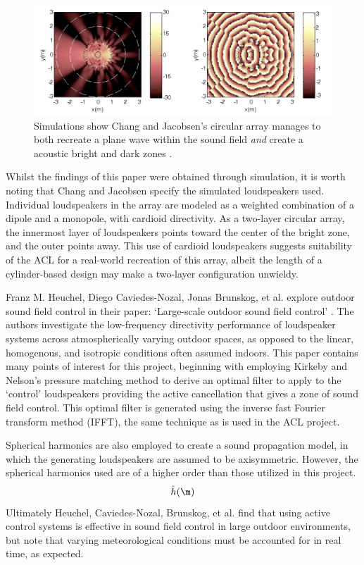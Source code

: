 \documentclass{report}
\begin{document}
        \begin{figure}[H]
            \centering
            \includegraphics[width = 0.6\linewidth]{figs/changField.png}
            \caption{Simulations show Chang and Jacobsen's circular array manages to both recreate a plane wave within the sound field \textit{and} create a acoustic bright and dark zones \cite{chang2012sound}.}
            \label{changField}
        \end{figure}

        Whilst the findings of this paper were obtained through simulation, it is worth noting that Chang and Jacobsen specify the simulated loudspeakers used.
        Individual loudspeakers in the array are modeled as a weighted combination of a dipole and a monopole, with cardioid directivity.
        As a two-layer circular array, the innermost layer of loudspeakers points toward the center of the bright zone, and the outer points away.
        This use of cardioid loudspeakers suggests suitability of the ACL for a real-world recreation of this array, albeit the length of a cylinder-based design may make a two-layer configuration unwieldy.

        Franz M. Heuchel, Diego Caviedes-Nozal, Jonas Brunskog, et al. explore outdoor sound field control in their paper: `Large-scale outdoor sound field control' \cite{heuchel2020large}.
        The authors investigate the low-frequency directivity performance of loudspeaker systems across atmospherically varying outdoor spaces, as opposed to the linear, homogenous, and isotropic conditions often assumed indoors.
        This paper contains many points of interest for this project, beginning with employing Kirkeby and Nelson's pressure matching method \cite{kirkeby1993reproduction} to derive an optimal filter to apply to the `control' loudspeakers providing the active cancellation that gives a zone of sound field control.
        This optimal filter is generated using the inverse fast Fourier transform method (IFFT), the same technique as is used in the ACL project.
        
        Spherical harmonics are also employed to create a sound propagation model, in which the generating loudspeakers are assumed to be axisymmetric.
        However, the spherical harmonics used are of a higher order than those utilized in this project.
        \begin{equation}
            \hat{h}(\m)

        \end{equation}
        Ultimately Heuchel, Caviedes-Nozal, Brunskog, et al. find that using active control systems is effective in sound field control in large outdoor environments, but note that varying meteorological conditions must be accounted for in real time, as expected.
        
\end{document}
